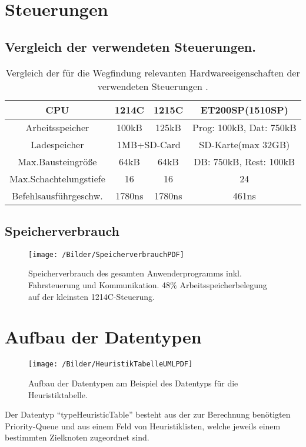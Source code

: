 \section{Steuerungen}
	
	\subsection{Vergleich der verwendeten Steuerungen.}
	
	\begin{table}[H]
		\centering
		\begin{longtable}{| c || c | c | c |}
			\hline
			CPU & 1214C & 1215C & ET200SP(1510SP)\\ \hline
			Arbeitsspeicher & 100kB & 125kB & Prog: 100kB, Dat: 750kB\\ \hline
			Ladespeicher & \multicolumn{2}{c|}{1MB+SD-Card} & SD-Karte(max 32GB)\\ \hline
			Max.Bausteingröße & 64kB & 64kB & DB: 750kB, Rest: 100kB\\ \hline
			Max.Schachtelungstiefe & 16 & 16 & 24 \\ \hline
			Befehlsausführgeschw. & 1780ns & 1780ns & 461ns\\ \hline
		\end{longtable}
		\vspace{0.2cm}
		\caption{Vergleich der für die Wegfindung relevanten Hardwareeigenschaften der verwendeten Steuerungen \cite{S7-1200}\cite{ET200SP}.}
	\end{table}	
		

	\subsection{Speicherverbrauch}
	
	\begin{figure}[H]
		\centering
		\texttt{[image: /Bilder/SpeicherverbrauchPDF]}
		\vspace{0.2cm}
		\caption{Speicherverbrauch des gesamten Anwenderprogramms inkl. Fahrsteuerung und Kommunikation. 48\% Arbeitsspeicherbelegung auf der kleinsten 1214C-Steuerung.}
	\end{figure}

\section{Aufbau der Datentypen}

	\begin{figure}[h]
		\centering
		\texttt{[image: /Bilder/HeuristikTabelleUMLPDF]}
		\vspace{0.2cm}
		\caption{Aufbau der Datentypen am Beispiel des Datentyps für die Heuristiktabelle.}
	\end{figure}
	 Der Datentyp "`typeHeuristicTable"' besteht aus der zur Berechnung benötigten Priority-Queue und aus einem Feld von Heuristiklisten, welche jeweils einem bestimmten Zielknoten zugeordnet sind.
	
